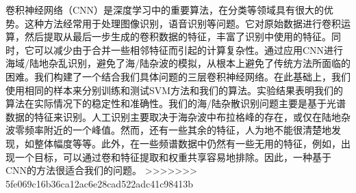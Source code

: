 卷积神经网络（CNN）是深度学习中的重要算法，在分类等领域具有很大的优势。这种方法经常用于处理图像识别，语音识别等问题。它对原始数据进行卷积运算，然后提取从最后一步生成的卷积数据的特征，丰富了识别中使用的特征。同时，它可以减少由于合并一些相邻特征而引起的计算复杂性。通过应用CNN进行海域/陆地杂乱识别，避免了海/陆杂波的模拟，从根本上避免了传统方法所面临的困难。我们构建了一个结合我们具体问题的三层卷积神经网络。在此基础上，我们使用相同的样本来分别训练和测试SVM方法和我们的算法。实验结果表明我们的算法在实际情况下的稳定性和准确性。我们的海/陆杂散识别问题主要是基于光谱数据的特征来识别。人工识别主要取决于海杂波中布拉格峰的存在，或仅在陆地杂波零频率附近的一个峰值。然而，还有一些其余的特征，人为地不能很清楚地发现，如整体幅度等等。此外，在一些频谱数据中仍然有一些无用的特征，例如，出现一个目标，可以通过卷和特征提取和权重共享容易地排除。因此，一种基于CNN的方法很适合我们的问题。
>>>>>>> 5fe069c16b36ca12ac6e28cad522adc41c98413b

